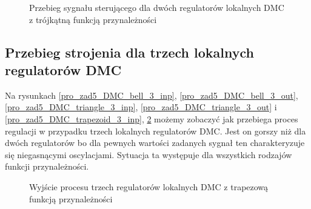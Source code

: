 \begin{figure}[b]
    \centering
    \caption{Przebieg sygnału sterującego dla dwóch regulatorów lokalnych DMC z trójkątną  funkcją przynależności}
    \label{pro_zad5_DMC_triangle_2_inp}
\end{figure}
\FloatBarrier

\subsection{Przebieg strojenia dla trzech lokalnych regulatorów DMC}
Na rysunkach \ref{pro_zad5_DMC_bell_3_inp}, \ref{pro_zad5_DMC_bell_3_out}, \ref{pro_zad5_DMC_triangle_3_inp}, \ref{pro_zad5_DMC_triangle_3_out} i \ref{pro_zad5_DMC_trapezoid_3_inp}, \ref{pro_zad5_DMC_trapezoid_3_out} możemy zobaczyć jak przebiega proces regulacji w przypadku trzech lokalnych regulatorów DMC. Jest on gorszy niż dla dwóch regulatorów bo dla pewnych wartości zadanych sygnał ten charakteryzuje się niegasnącymi oscylacjami. Sytuacja ta występuje dla wszystkich rodzajów funkcji przynależności. 
\begin{figure}[t]
    \centering
    \caption{Wyjście procesu trzech regulatorów lokalnych DMC z trapezową funkcją przynależności}
    \label{pro_zad5_DMC_trapezoid_3_out}
\end{figure}

